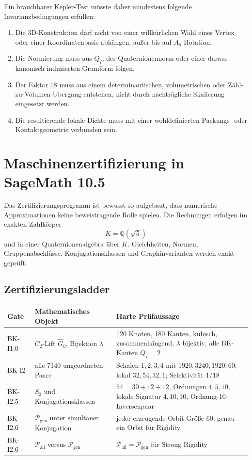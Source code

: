 \documentclass[11pt,a4paper]{article}
\theoremstyle{definition}
\newcommand{\QI}{Q_I}
\newcommand{\Pgen}{\mathcal P_{\mathrm{gen}}}
\newcommand{\Pall}{\mathcal P_{\mathrm{all}}}
\begin{document}
Ein brauchbarer Kepler-Test müsste daher mindestens folgende Invarianzbedingungen erfüllen:
\begin{enumerate}
\item Die 3D-Konstruktion darf nicht von einer willkürlichen Wahl eines Vertex oder einer Koordinatenbasis abhängen, außer bis auf \(A_5\)-Rotation.
\item Die Normierung muss aus \(\QI\), der Quaternionennorm oder einer daraus kanonisch induzierten Gramform folgen.
\item Der Faktor \(18\) muss aus einem determinantischen, volumetrischen oder Zähl-zu-Volumen-Übergang entstehen, nicht durch nachträgliche Skalierung eingesetzt werden.
\item Die resultierende lokale Dichte muss mit einer wohldefinierten Packungs- oder Kontaktgeometrie verbunden sein.
\end{enumerate}

\section{Maschinenzertifizierung in SageMath 10.5}

Das Zertifizierungsprogramm ist bewusst so aufgebaut, dass numerische Approximationen keine beweistragende Rolle spielen. Die Rechnungen erfolgen im exakten Zahlkörper
\[
K=\mathbb Q(\sqrt5)
\]
und in einer Quaternionenalgebra über \(K\). Gleichheiten, Normen, Gruppenabschlüsse, Konjugationsklassen und Graphinvarianten werden exakt geprüft.

\subsection{Zertifizierungsladder}

\begin{longtable}{>{\raggedright\arraybackslash}p{2.1cm}p{5.1cm}p{6.1cm}}
\toprule
\textbf{Gate} & \textbf{Mathematisches Objekt} & \textbf{Harte Prüfaussage}\\
\midrule
\endhead
BK-I1.0 & \(C_2\)-Lift \(\widehat G_0\), Bijektion \(\lambda\) & 120 Knoten, 180 Kanten, kubisch, zusammenhängend, \(\lambda\) bijektiv, alle BK-Kanten \(\QI=2\)\\
BK-I2 & alle 7140 ungeordneten Paare & Schalen \(1,2,3,4\) mit \(1920,3240,1920,60\); lokal \(32,54,32,1\); Selektivität \(1/18\)\\
BK-I2.5 & \(S_2\) und Konjugationsklassen & \(54=30+12+12\), Ordnungen \(4,5,10\), lokale Signatur \(4,10,10\), Ordnung-10-Inversenpaar\\
BK-I2.6 & \(\Pgen\) unter simultaner Konjugation & jeder erzeugende Orbit Größe 60; genau ein Orbit für Rigidity\\
BK-I2.6+ & \(\Pall\) versus \(\Pgen\) & \(\Pall=\Pgen\) für Strong Rigidity\\
\bottomrule
\end{longtable}
\end{document}
